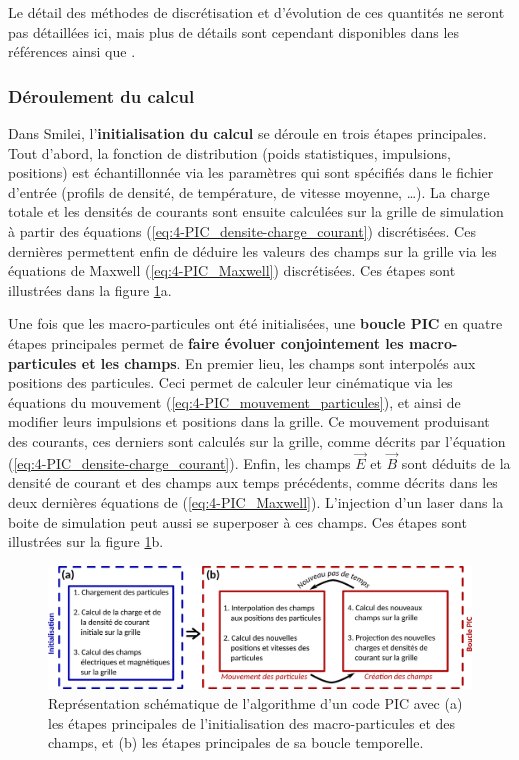 \begin{refsection}
Le détail des méthodes de discrétisation et d'évolution de ces quantités ne seront pas détaillées ici, mais plus de détails sont cependant disponibles dans les références \parencite{derouillat_2018} ainsi que \parencite{nuter_2014}.

\subsubsection{Déroulement du calcul}

Dans Smilei, l'\textbf{initialisation du calcul} se déroule en trois étapes principales. Tout d'abord, la fonction de distribution (poids statistiques, impulsions, positions) est échantillonnée via les paramètres qui sont spécifiés dans le fichier d'entrée (profils de densité, de température, de vitesse moyenne, …). La charge totale et les densités de courants sont ensuite calculées sur la grille de simulation à partir des équations (\ref{eq:4-PIC_densite-charge_courant}) discrétisées. Ces dernières permettent enfin de déduire les valeurs des champs sur la grille via les équations de Maxwell (\ref{eq:4-PIC_Maxwell}) discrétisées. Ces étapes sont illustrées dans la figure \ref{fig:4-PIC_algo}a.

Une fois que les macro-particules ont été initialisées, une \textbf{boucle PIC} en quatre étapes principales permet de \textbf{faire évoluer conjointement les macro-particules et les champs}. En premier lieu, les champs sont interpolés aux positions des particules. Ceci permet de calculer leur cinématique via les équations du mouvement (\ref{eq:4-PIC_mouvement_particules}), et ainsi de modifier leurs impulsions et positions dans la grille. Ce mouvement produisant des courants, ces derniers sont calculés sur la grille, comme décrits par l'équation (\ref{eq:4-PIC_densite-charge_courant}). Enfin, les champs $\vec{E}$ et $\vec{B}$ sont déduits de la densité de courant et des champs aux temps précédents, comme décrits dans les deux dernières équations de (\ref{eq:4-PIC_Maxwell}). L'injection d'un laser dans la boite de simulation peut aussi se superposer à ces champs. Ces étapes sont illustrées sur la figure \ref{fig:4-PIC_algo}b.

\begin{figure}[hbtp]
	\centering
	\includegraphics[width=\linewidth]{4-simulation/principe_PIC.png}
	\caption{Représentation schématique de l'algorithme d'un code PIC avec (a) les étapes principales de l'initialisation des macro-particules et des champs, et (b) les étapes principales de sa boucle temporelle.}
	\label{fig:4-PIC_algo}
\end{figure}


\end{refsection}

